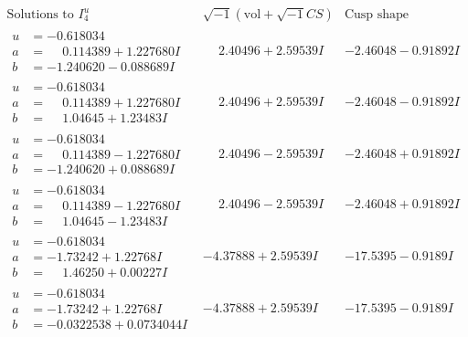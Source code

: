 \documentclass[1p]{elsarticle_modified}
\theoremstyle{definition}
\newcommand{\I}{\sqrt{-1}}
\begin{document}
$$\begin{array}{c|c|c}  
\text{Solutions to }I^u_{4}& \I (\text{vol} + \sqrt{-1}CS) & \text{Cusp shape}\\
 \hline 
\begin{aligned}
u &= -0.618034\phantom{ +0.000000I} \\
a &= \phantom{-}0.114389 + 1.227680 I \\
b &= -1.240620 - 0.088689 I\end{aligned}
 & \phantom{-}2.40496 + 2.59539 I & -2.46048 - 0.91892 I \\ \hline\begin{aligned}
u &= -0.618034\phantom{ +0.000000I} \\
a &= \phantom{-}0.114389 + 1.227680 I \\
b &= \phantom{-}1.04645 + 1.23483 I\end{aligned}
 & \phantom{-}2.40496 + 2.59539 I & -2.46048 - 0.91892 I \\ \hline\begin{aligned}
u &= -0.618034\phantom{ +0.000000I} \\
a &= \phantom{-}0.114389 - 1.227680 I \\
b &= -1.240620 + 0.088689 I\end{aligned}
 & \phantom{-}2.40496 - 2.59539 I & -2.46048 + 0.91892 I \\ \hline\begin{aligned}
u &= -0.618034\phantom{ +0.000000I} \\
a &= \phantom{-}0.114389 - 1.227680 I \\
b &= \phantom{-}1.04645 - 1.23483 I\end{aligned}
 & \phantom{-}2.40496 - 2.59539 I & -2.46048 + 0.91892 I \\ \hline\begin{aligned}
u &= -0.618034\phantom{ +0.000000I} \\
a &= -1.73242 + 1.22768 I \\
b &= \phantom{-}1.46250 + 0.00227 I\end{aligned}
 & -4.37888 + 2.59539 I & -17.5395 - 0.9189 I \\ \hline\begin{aligned}
u &= -0.618034\phantom{ +0.000000I} \\
a &= -1.73242 + 1.22768 I \\
b &= -0.0322538 + 0.0734044 I\end{aligned}
 & -4.37888 + 2.59539 I & -17.5395 - 0.9189 I \\ \hline\begin{aligned}

\end{aligned}
\end{array}$$
\end{document}
